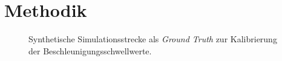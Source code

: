 \chapter{Methodik}
\label{chap:methodology}

\lipsum[1]

\begin{figure}[htbp]
    \centering

    \begin{minipage}[c]{0.49\textwidth}
      \centering
      \noindent
    \end{minipage}%
    \hfill
    \begin{minipage}[c]{0.49\textwidth}
      \centering
      
    \end{minipage}

    \begin{minipage}[t]{0.49\textwidth}
    \end{minipage}
    \hfill
    \begin{minipage}[t]{0.49\textwidth}
    \end{minipage}

    \smallskip

    

    \caption{Synthetische Simulationsstrecke als \textit{Ground Truth} zur Kalibrierung der Beschleunigungsschwellwerte.}
    \label{fig:sim_strecke}
  \end{figure}


